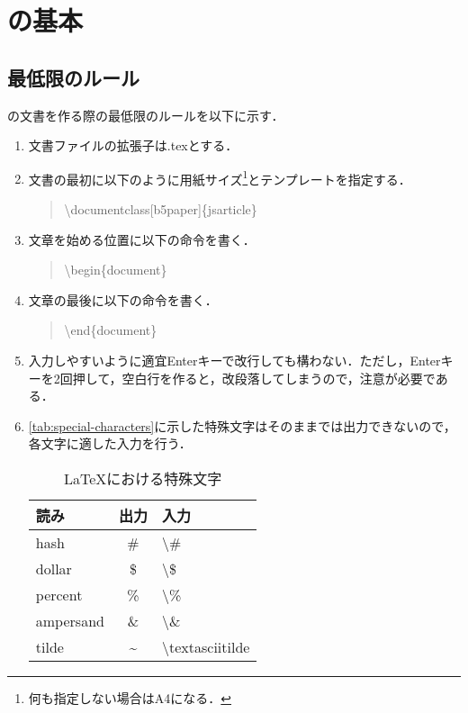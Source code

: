 \section{\LaTeXe の基本}
\subsection{最低限のルール}
\label{sec:basic_rule}

\LaTeXe の文書を作る際の最低限のルールを以下に示す．
\begin{enumerate}
  \item 文書ファイルの拡張子は.texとする．
  \item 文書の最初に以下のように用紙サイズ\footnote{何も指定しない場合はA4になる．}とテンプレートを指定する．
    \begin{quote}
      \textbackslash documentclass[b5paper]\{jsarticle\}
    \end{quote}
  \item 文章を始める位置に以下の命令を書く．
    \begin{quote}
      \textbackslash begin\{document\}
    \end{quote}
  \item 文章の最後に以下の命令を書く．
    \begin{quote}
      \textbackslash end\{document\}
    \end{quote}
  \item 入力しやすいように適宜Enterキーで改行しても構わない．ただし，Enterキーを2回押して，空白行を作ると，改段落してしまうので，注意が必要である．
  \item \tab\ref{tab:special-characters}に示した特殊文字はそのままでは出力できないので，各文字に適した入力を行う．
    \begin{table}[H]
      \caption{\LaTeX における特殊文字}
      \centering
        \begin{tabular}{lcl}
        \hline
        \textbf{読み}       & \textbf{出力} & \textbf{入力} \\ \hline
          hash               & \#            & \textbackslash\# \\ 
          dollar             & \$            & \textbackslash\$ \\ 
          percent            & \%            & \textbackslash\% \\ 
          ampersand          & \&            & \textbackslash\& \\ 
          tilde              & \~{}          & \textbackslash textasciitilde \\ 

\end{tabular}
\end{table}
\end{enumerate}
